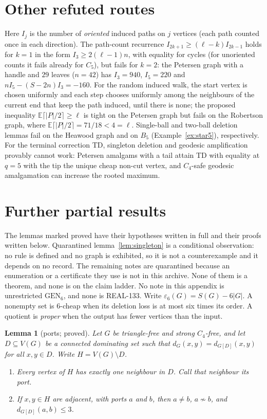 \documentclass[11pt]{amsart}
\newtheorem{lemma}[theorem]{Lemma}
\theoremstyle{definition}
\theoremstyle{remark}
\newcommand{\lr}{\ell}
\newcommand{\GEN}{\mathrm{GEN}}
\begin{document}
\section{Other refuted routes}\label{app:routes}
Here $I_j$ is the number of \emph{oriented} induced paths on $j$ vertices (each path counted once in each direction). The path-count recurrence $I_{2k+1}\ge(\lr-k)I_{2k-1}$ holds for $k=1$ in the form $I_3\ge2(\lr-1)n$, with equality for cycles (for unoriented counts it fails already for $C_5$), but fails for $k=2$: the Petersen graph with a handle and $29$ leaves ($n=42$) has $I_3=940$, $I_5=220$ and $nI_5-(S-2n)I_3=-160$. For the random induced walk, the start vertex is chosen uniformly and each step chooses uniformly among the neighbours of the current end that keep the path induced, until there is none; the proposed inequality $\mathbb E\lceil|P|/2\rceil\ge\lr$ is tight on the Petersen graph but fails on the Robertson graph, where $\mathbb E\lceil|P|/2\rceil=71/18<4=\lr$. Single-ball and two-ball deletion lemmas fail on the Heawood graph and on $B_5$ (Example~\ref{ex:star5}), respectively. For the terminal correction TD, singleton deletion and geodesic amplification provably cannot work: Petersen amalgams with a tail attain TD with equality at $q=5$ with the tip the unique cheap non-cut vertex, and $C_4$-safe geodesic amalgamation can increase the rooted maximum.

\section{Further partial results}\label{app:window}

The lemmas marked proved have their hypotheses written in full and their proofs written below. Quarantined lemma~\ref{lem:singleton} is a conditional observation: no rule is defined and no graph is exhibited, so it is not a counterexample and it depends on no record. The remaining notes are quarantined because an enumeration or a certificate they use is not in this archive. None of them is a theorem, and none is on the claim ladder. No note in this appendix is unrestricted $\GEN_6$, and none is REAL-133. Write $\varepsilon_6(G)=S(G)-6|G|$. A nonempty set is $6$-cheap when its deletion loss is at most six times its order. A quotient is \emph{proper} when the output has fewer vertices than the input.

\begin{lemma}[ports; proved]\label{lem:core}
Let $G$ be triangle-free and strong $C_4$-free, and let $D\subseteq V(G)$ be a connected dominating set such that $d_G(x,y)=d_{G[D]}(x,y)$ for all $x,y\in D$. Write $H=V(G)\setminus D$.
\begin{enumerate}
\item Every vertex of $H$ has exactly one neighbour in $D$. Call that neighbour its \emph{port}.
\item If $x,y\in H$ are adjacent, with ports $a$ and $b$, then $a\ne b$, $a\not\sim b$, and $d_{G[D]}(a,b)\le 3$.
\end{enumerate}
\end{lemma}
\end{document}
